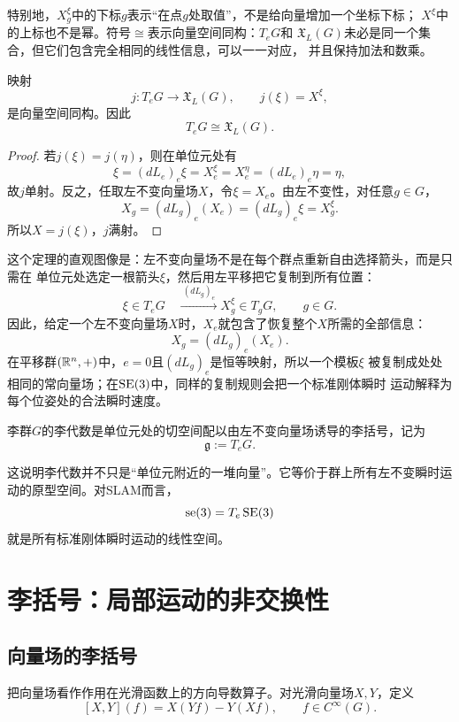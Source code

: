 特别地，$X^\xi_g$中的下标$g$表示“在点$g$处取值”，不是给向量增加一个坐标下标；
$X^\xi$中的上标也不是幂。符号$\cong$表示向量空间同构：$T_eG$和
$\mathfrak X_L(G)$未必是同一个集合，但它们包含完全相同的线性信息，可以一一对应，
并且保持加法和数乘。

\begin{theorem}[单位元切空间与左不变向量场]
映射
\[
    j:T_eG\to\mathfrak X_L(G),
    \qquad
    j(\xi)=X^\xi,
\]
是向量空间同构。因此
\[
    T_eG\cong\mathfrak X_L(G).
\]
\end{theorem}

\begin{proof}
若$j(\xi)=j(\eta)$，则在单位元处有
\[
    \xi=(dL_e)_e\xi=X^\xi_e=X^\eta_e=(dL_e)_e\eta=\eta,
\]
故$j$单射。反之，任取左不变向量场$X$，令$\xi=X_e$。由左不变性，对任意$g\in G$，
\[
    X_g=(dL_g)_e(X_e)=(dL_g)_e\xi=X^\xi_g.
\]
所以$X=j(\xi)$，$j$满射。
\end{proof}

这个定理的直观图像是：左不变向量场不是在每个群点重新自由选择箭头，而是只需在
单位元处选定一根箭头$\xi$，然后用左平移把它复制到所有位置：
\[
\xi\in T_eG
\quad\xrightarrow{\ (dL_g)_e\ }
X_g^\xi\in T_gG,
\qquad g\in G.
\]
因此，给定一个左不变向量场$X$时，$X_e$就包含了恢复整个$X$所需的全部信息：
\[
    X_g=(dL_g)_e(X_e).
\]
在平移群$(\mathbb{R}^n,+)$中，$e=0$且$(dL_g)_e$是恒等映射，所以一个模板$\xi$
被复制成处处相同的常向量场；在$\operatorname{SE}(3)$中，同样的复制规则会把一个标准刚体瞬时
运动解释为每个位姿处的合法瞬时速度。

\begin{definition}[李代数]
李群$G$的李代数是单位元处的切空间配以由左不变向量场诱导的李括号，记为
\[
    \mathfrak g:=T_eG.
\]
\end{definition}

这说明李代数并不只是“单位元附近的一堆向量”。它等价于群上所有左不变瞬时运动的原型空间。对SLAM而言，
\[
    \operatorname{se}(3)=T_e\operatorname{SE}(3)
\]
就是所有标准刚体瞬时运动的线性空间。


\section{李括号：局部运动的非交换性}

\subsection{向量场的李括号}

\begin{definition}[向量场李括号]
把向量场看作作用在光滑函数上的方向导数算子。对光滑向量场$X,Y$，定义
\[
    [X,Y](f)=X(Yf)-Y(Xf),
    \qquad f\in C^\infty(G).
\]
\end{definition}

